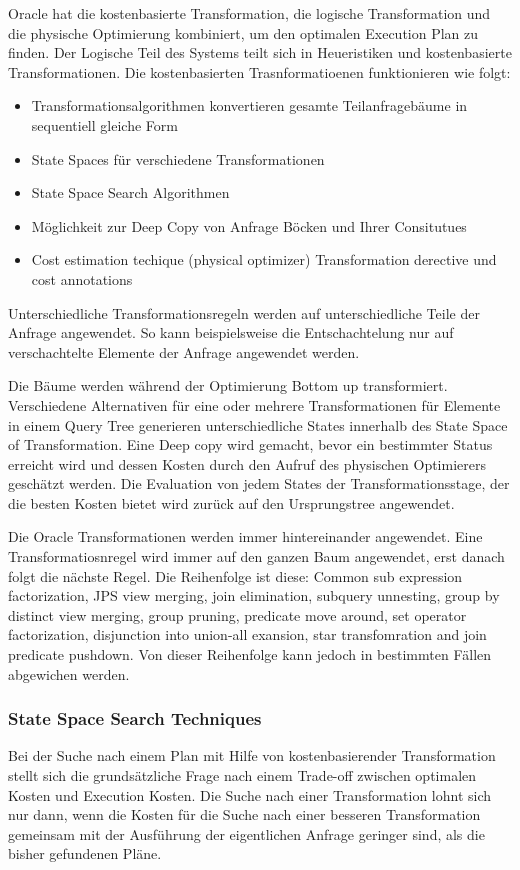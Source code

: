 Oracle hat die kostenbasierte Transformation, die logische Transformation und die physische Optimierung kombiniert, um den optimalen Execution Plan zu finden. Der Logische Teil des Systems teilt sich in Heueristiken und kostenbasierte Transformationen. Die kostenbasierten Trasnformatioenen funktionieren wie folgt:

\begin{itemize}
\item Transformationsalgorithmen konvertieren gesamte Teilanfragebäume in sequentiell gleiche Form
\item State Spaces für verschiedene Transformationen
\item State Space Search Algorithmen
\item Möglichkeit zur Deep Copy von Anfrage Böcken und Ihrer Consitutues
\item Cost estimation techique (physical optimizer)
Transformation derective und cost annotations
\end{itemize}

Unterschiedliche Transformationsregeln werden auf unterschiedliche Teile der Anfrage angewendet. So kann beispielsweise die Entschachtelung nur auf verschachtelte Elemente der Anfrage angewendet werden. 

Die Bäume werden während der Optimierung Bottom up transformiert. Verschiedene Alternativen für eine oder mehrere Transformationen für Elemente in einem Query Tree generieren unterschiedliche States innerhalb des State Space of Transformation. Eine Deep copy wird gemacht, bevor ein bestimmter Status erreicht wird und dessen Kosten durch den Aufruf des physischen Optimierers geschätzt werden. Die Evaluation von jedem States der Transformationsstage, der die besten Kosten bietet wird zurück auf den Ursprungstree angewendet.

Die Oracle Transformationen werden immer hintereinander angewendet. Eine Transformatiosnregel wird immer auf den ganzen Baum angewendet, erst danach folgt die nächste Regel. Die Reihenfolge ist diese: Common sub expression factorization, JPS view merging, join elimination, subquery unnesting, group by distinct view merging, group pruning, predicate move around, set operator factorization, disjunction into union-all exansion, star transfomration and join predicate pushdown. Von dieser Reihenfolge kann jedoch in bestimmten Fällen abgewichen werden. 



\subsubsection{State Space Search Techniques}
Bei der Suche nach einem Plan mit Hilfe von kostenbasierender Transformation stellt sich die grundsätzliche Frage nach einem Trade-off zwischen optimalen Kosten und Execution Kosten. Die Suche nach einer Transformation lohnt sich nur dann, wenn die Kosten für die Suche nach einer besseren Transformation gemeinsam mit der Ausführung der eigentlichen Anfrage geringer sind, als die bisher gefundenen Pläne.


